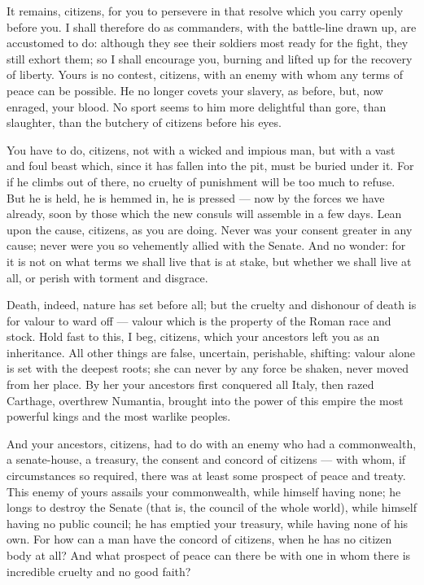  It remains, citizens, for you to persevere in that resolve which you carry openly before you. I shall therefore do as commanders, with the battle-line drawn up, are accustomed to do: although they see their soldiers most ready for the fight, they still exhort them; so I shall encourage you, burning and lifted up for the recovery of liberty. Yours is no contest, citizens, with an enemy with whom any terms of peace can be possible. He no longer covets your slavery, as before, but, now enraged, your blood. No sport seems to him more delightful than gore, than slaughter, than the butchery of citizens before his eyes.

 You have to do, citizens, not with a wicked and impious man, but with a vast and foul beast which, since it has fallen into the pit, must be buried under it. For if he climbs out of there, no cruelty of punishment will be too much to refuse. But he is held, he is hemmed in, he is pressed --- now by the forces we have already, soon by those which the new consuls will assemble in a few days. Lean upon the cause, citizens, as you are doing. Never was your consent greater in any cause; never were you so vehemently allied with the Senate. And no wonder: for it is not on what terms we shall live that is at stake, but whether we shall live at all, or perish with torment and disgrace.

 Death, indeed, nature has set before all; but the cruelty and dishonour of death is for valour to ward off --- valour which is the property of the Roman race and stock. Hold fast to this, I beg, citizens, which your ancestors left you as an inheritance. All other things are false, uncertain, perishable, shifting: valour alone is set with the deepest roots; she can never by any force be shaken, never moved from her place. By her your ancestors first conquered all Italy, then razed Carthage, overthrew Numantia, brought into the power of this empire the most powerful kings and the most warlike peoples.

 And your ancestors, citizens, had to do with an enemy who had a commonwealth, a senate-house, a treasury, the consent and concord of citizens --- with whom, if circumstances so required, there was at least some prospect of peace and treaty. This enemy of yours assails your commonwealth, while himself having none; he longs to destroy the Senate (that is, the council of the whole world), while himself having no public council; he has emptied your treasury, while having none of his own. For how can a man have the concord of citizens, when he has no citizen body at all? And what prospect of peace can there be with one in whom there is incredible cruelty and no good faith?

